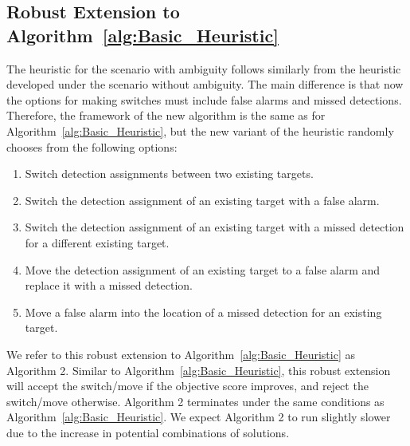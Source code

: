 \subsection{Robust Extension to Algorithm~\ref{alg:Basic_Heuristic}}
The heuristic for the scenario with ambiguity follows similarly from the heuristic developed under the scenario without ambiguity. The main difference is that now the options for making switches must include false alarms and missed detections. Therefore, the framework of the new algorithm is the same as for Algorithm~\ref{alg:Basic_Heuristic}, but the new variant of the heuristic randomly chooses from the following options: 
\begin{enumerate}
  \item Switch detection assignments between two existing targets.
  \item Switch the detection assignment of an existing target with a false alarm.
  \item Switch the detection assignment of an existing target with a missed detection for a different existing target.
  \item Move the detection assignment of an existing target to a false alarm and replace it with a missed detection.
  \item Move a false alarm into the location of a missed detection for an existing target.
\end{enumerate}

We refer to this robust extension to Algorithm~\ref{alg:Basic_Heuristic} as Algorithm 2. Similar to Algorithm~\ref{alg:Basic_Heuristic}, this robust extension will accept the switch/move if the objective score improves, and reject the switch/move otherwise. Algorithm 2 terminates under the same conditions as Algorithm~\ref{alg:Basic_Heuristic}. We expect Algorithm 2 to run slightly slower due to the increase in potential combinations of solutions. 